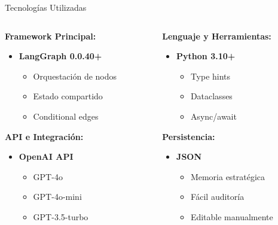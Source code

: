 \documentclass[aspectratio=169,11pt]{beamer}
\begin{document}
\begin{frame}{Tecnologías Utilizadas}
\begin{columns}[T]
\begin{column}{0.48\textwidth}
\textbf{Framework Principal:}
\begin{itemize}
    \item \textcolor{kavakblue}{\textbf{LangGraph 0.0.40+}}
    \begin{itemize}
        \item Orquestación de nodos
        \item Estado compartido
        \item Conditional edges
    \end{itemize}
\end{itemize}

\vspace{0.3cm}

\textbf{API e Integración:}
\begin{itemize}
    \item \textcolor{kavakgreen}{\textbf{OpenAI API}}
    \begin{itemize}
        \item GPT-4o
        \item GPT-4o-mini
        \item GPT-3.5-turbo
    \end{itemize}
\end{itemize}
\end{column}

\begin{column}{0.48\textwidth}
\textbf{Lenguaje y Herramientas:}
\begin{itemize}
    \item \textcolor{kavakorange}{\textbf{Python 3.10+}}
    \begin{itemize}
        \item Type hints
        \item Dataclasses
        \item Async/await
    \end{itemize}
\end{itemize}

\vspace{0.3cm}

\textbf{Persistencia:}
\begin{itemize}Mixed Team 2
    \item \textcolor{kavakred}{\textbf{JSON}}
    \begin{itemize}
        \item Memoria estratégica
        \item Fácil auditoría
        \item Editable manualmente
    \end{itemize}
\end{itemize}
\end{column}
\end{columns}
\end{frame}
\end{document}
